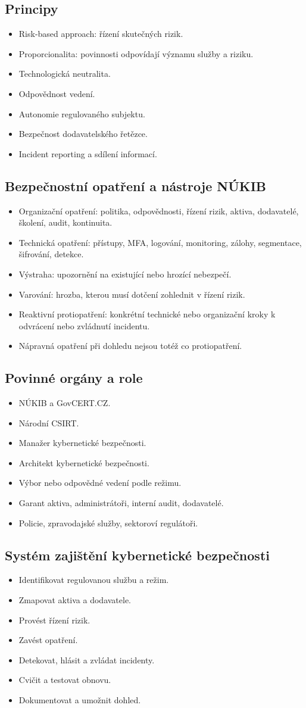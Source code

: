 \documentclass[10pt,a4paper]{article}
\newcommand{\blok}[1]{\subsection*{#1}}
\begin{document}
\blok{Principy}
\begin{itemize}
  \item Risk-based approach: řízení skutečných rizik.
  \item Proporcionalita: povinnosti odpovídají významu služby a riziku.
  \item Technologická neutralita.
  \item Odpovědnost vedení.
  \item Autonomie regulovaného subjektu.
  \item Bezpečnost dodavatelského řetězce.
  \item Incident reporting a sdílení informací.
\end{itemize}

\blok{Bezpečnostní opatření a nástroje NÚKIB}
\begin{itemize}
  \item Organizační opatření: politika, odpovědnosti, řízení rizik, aktiva, dodavatelé, školení, audit, kontinuita.
  \item Technická opatření: přístupy, MFA, logování, monitoring, zálohy, segmentace, šifrování, detekce.
  \item Výstraha: upozornění na existující nebo hrozící nebezpečí.
  \item Varování: hrozba, kterou musí dotčení zohlednit v řízení rizik.
  \item Reaktivní protiopatření: konkrétní technické nebo organizační kroky k odvrácení nebo zvládnutí incidentu.
  \item Nápravná opatření při dohledu nejsou totéž co protiopatření.
\end{itemize}

\blok{Povinné orgány a role}
\begin{itemize}
  \item NÚKIB a GovCERT.CZ.
  \item Národní CSIRT.
  \item Manažer kybernetické bezpečnosti.
  \item Architekt kybernetické bezpečnosti.
  \item Výbor nebo odpovědné vedení podle režimu.
  \item Garant aktiva, administrátoři, interní audit, dodavatelé.
  \item Policie, zpravodajské služby, sektoroví regulátoři.
\end{itemize}

\blok{Systém zajištění kybernetické bezpečnosti}
\begin{itemize}
  \item Identifikovat regulovanou službu a režim.
  \item Zmapovat aktiva a dodavatele.
  \item Provést řízení rizik.
  \item Zavést opatření.
  \item Detekovat, hlásit a zvládat incidenty.
  \item Cvičit a testovat obnovu.
  \item Dokumentovat a umožnit dohled.
\end{itemize}
\end{document}
